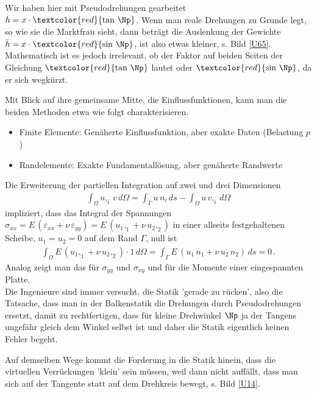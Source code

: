 {\begin{remark}
Wir haben hier mit Pseudodrehungen gearbeitet $h = x\cdot \textcolor{red}{\tan\,\Np}$. Wenn man reale Drehungen zu Grunde legt, so wie sie die Marktfrau sieht, dann betr\"{a}gt die Auslenkung der Gewichte $\bar{h} = x\cdot\textcolor{red}{\sin\,\Np}$, ist also etwas kleiner, s. Bild \ref{U65}. Mathematisch ist es jedoch irrelevant, ob der Faktor auf beiden Seiten der Gleichung $\textcolor{red}{\tan\,\Np}$ lautet oder $\textcolor{red}{\sin\,\Np}$, da er sich wegk\"{u}rzt.
\end{remark}


Mit Blick auf ihre gemeinsame Mitte, die Einflussfunktionen, kann man die beiden Methoden etwa wie folgt charakterisieren. \\

\begin{itemize}
  \item Finite Elemente: Gen\"{a}herte Einflussfunktion, aber exakte Daten (Belastung $p$)
  \item Randelemente: Exakte Fundamentall\"{o}sung, aber gen\"{a}herte Randwerte
\end{itemize}

Die Erweiterung der partiellen Integration auf zwei und drei Dimensionen
\begin{align}
\int_{\Omega} u,_i \,v\,d\Omega = \int_{\Gamma} u\,n_i\,ds - \int_{\Omega} u\,v,_i\,d\Omega
\end{align}
impliziert, dass das Integral der Spannungen $\sigma_{xx} = E\,(\varepsilon_{xx} + \nu\,\varepsilon_{yy}) = E\,(u_1,_1 + \nu\,u_2,_2)$ in einer allseits festgehaltenen Scheibe, $u_1 = u_2 = 0$ auf dem Rand $\Gamma$, null ist
\begin{align}
\int_{\Omega} E\,(u_1,_1 + \nu\,u_2,_2) \cdot 1\,d\Omega = \int_{\Gamma} E\,(u_1\,n_1 + \nu\,u_2\,n_2)\,ds = 0\,.
\end{align}
Analog zeigt man das f\"{u}r $\sigma_{yy}$ und $\sigma_{xy}$ und f\"{u}r die Momente einer eingespannten Platte.\\

Die Ingenieure sind immer versucht, die Statik 'gerade zu r\"{u}cken', also die Tatsache, dass man in der Balkenstatik die Drehungen durch Pseudodrehungen ersetzt, damit zu rechtfertigen, dass f\"{u}r kleine Drehwinkel $\Np$ ja der Tangens ungef\"{a}hr gleich dem Winkel selbst ist und daher die Statik eigentlich keinen Fehler begeht.

Auf demselben Wege kommt die Forderung in die Statik hinein, dass die virtuellen Verr\"{u}ckungen 'klein' sein m\"{u}ssen, weil dann nicht auff\"{a}llt, dass man sich auf der Tangente statt auf dem Drehkreis bewegt, s. Bild \ref{U14}.

}
